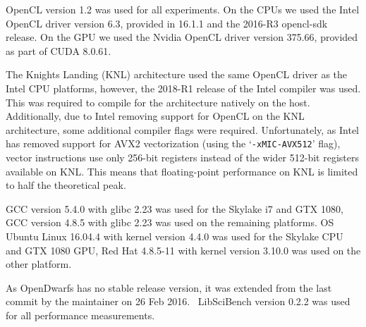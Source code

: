 \documentclass[../document.tex]{subfiles}
\begin{document}
\label{ssec:software}

OpenCL version 1.2 was used for all experiments.
On the CPUs we used the Intel OpenCL driver version 6.3, provided in 16.1.1 and the 2016-R3 opencl-sdk release.
On the GPU we used the Nvidia OpenCL driver version 375.66, provided as part of CUDA 8.0.61.

The Knights Landing (KNL) architecture used the same OpenCL driver as the Intel CPU platforms, however, the 2018-R1 release of the Intel compiler was used.
This was required to compile for the architecture natively on the host.
Additionally, due to Intel removing support for OpenCL on the KNL architecture, some additional compiler flags were required.
Unfortunately, as Intel has removed support for AVX2 vectorization (using the `{\tt -xMIC-AVX512}' flag), vector instructions use only 256-bit registers instead of the wider 512-bit registers available on KNL.
This means that floating-point performance on KNL is limited to half the theoretical peak.

GCC version 5.4.0 with glibc 2.23 was used for the Skylake i7 and GTX 1080,  
GCC version 4.8.5 with glibc 2.23 was used on the remaining platforms.
OS Ubuntu Linux 16.04.4 with kernel version 4.4.0 was used for the Skylake CPU and GTX 1080 GPU, Red Hat 4.8.5-11 with kernel version 3.10.0 was used on the other platform.

As OpenDwarfs has no stable release version, it was extended from the last commit by the maintainer on 26 Feb 2016.~\cite{opendwarfs2017base}
LibSciBench version 0.2.2 was used for all performance measurements.
\end{document}
